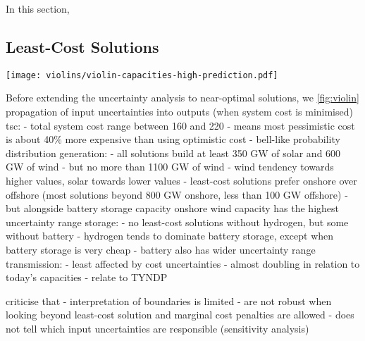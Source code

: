 In this section,

\subsection{Least-Cost Solutions}

\begin{SCfigure}
    \texttt{[image: violins/violin-capacities-high-prediction.pdf]}
    \caption{
      Distribution of total system cost, generation, storage, and transmission capacities
      for least-cost solutions.
    }
    \label{fig:violin}
\end{SCfigure}

Before extending the uncertainty analysis to near-optimal solutions,
we 
\cref{fig:violin}
propagation of input uncertainties into outputs (when system cost is minimised)
tsc:
- total system cost range between 160 and 220
- means most pessimistic cost is about 40\% more expensive than using optimistic cost
- bell-like probability distribution
generation:
- all solutions build at least 350 GW of solar and 600 GW of wind
- but no more than 1100 GW of wind
- wind tendency towards higher values, solar towards lower values
- least-cost solutions prefer onshore over offshore (most solutions beyond 800 GW onshore, less than 100 GW offshore)
- but alongside battery storage capacity onshore wind capacity has the highest uncertainty range
storage:
- no least-cost solutions without hydrogen, but some without battery
- hydrogen tends to dominate battery storage, except when battery storage is very cheap
- battery also has wider uncertainty range
transmission:
- least affected by cost uncertainties
- almost doubling in relation to today's capacities
- relate to TYNDP

criticise that
- interpretation of boundaries is limited
- are not robust when looking beyond least-cost solution and marginal cost penalties are allowed
- does not tell which input uncertainties are responsible (sensitivity analysis)


